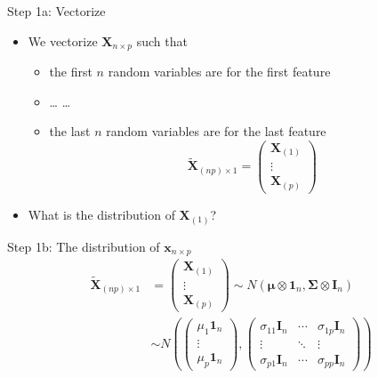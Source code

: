 \documentclass[
  ignorenonframetext,
]{beamer}
\providecommand{\tightlist}{%
  \setlength{\itemsep}{0pt}\setlength{\parskip}{0pt}}
\begin{document}
\begin{frame}{Step 1a: Vectorize}
\protect\hypertarget{step-1a-vectorize}{}
\begin{itemize}
\tightlist
\item
  We vectorize \(\mathbf X_{n\times p}\) such that

  \begin{itemize}
  \tightlist
  \item
    the first \(n\) random variables are for the first feature
  \item
    \ldots{} \ldots{}
  \item
    the last \(n\) random variables are for the last feature
    \[\tilde {\mathbf X}_{(np)\times 1}=
    \begin{pmatrix}
    \mathbf X_{(1)}\\ \vdots \\ \mathbf X_{(p)} \end{pmatrix}\]
  \end{itemize}
\item
  What is the distribution of \(\mathbf X_{(1)}\)?
\end{itemize}
\end{frame}

\begin{frame}{Step 1b: The distribution of \(\mathbf x_{n\times p}\)}
\protect\hypertarget{step-1b-the-distribution-of-mathbf-x_ntimes-p}{}
\[
\begin{aligned}
\tilde {\mathbf X}_{(np)\times 1} &=
\begin{pmatrix}
\mathbf X_{(1)}\\ \vdots \\ \mathbf X_{(p)} \end{pmatrix}
\sim N(\boldsymbol \mu \otimes\mathbf 1_n, 
\boldsymbol \Sigma \otimes \mathbf I_n)\\
&\sim 
N (
\begin{pmatrix}\mu_1 \mathbf 1_n \\ \vdots \\\mu_p \mathbf 1_n\end{pmatrix},  
\begin{pmatrix}
\sigma_{11}\mathbf I_n & \cdots & \sigma_{1p}\mathbf I_n\\
\vdots & \ddots & \vdots \\
\sigma_{p1}\mathbf I_n & \cdots & \sigma_{pp}\mathbf I_n
\end{pmatrix})
\end{aligned}
\]
\end{frame}
\end{document}
